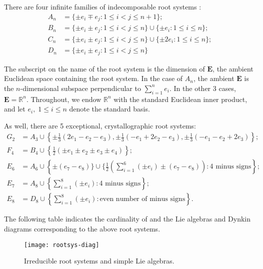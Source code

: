 \documentclass[12pt]{article}
\newcommand{\Eset}{\mathbf{E}}
\newcommand{\Rset}{\mathbb{R}}
\begin{document}
There are four infinite families of indecomposable root systems :
\begin{align*}
A_n &=\{ \pm e_i\mp e_j \colon 1\leq i<j\leq n+1\};\\
B_n &=\{\pm e_i\pm e_j \colon 1\leq i<j\leq n\}\cup \{ \pm e_i \colon
1\leq i\leq n\};\\
C_n &=\{\pm e_i\pm e_j \colon 1\leq i<j\leq n\}\cup\{\pm 2e_i \colon
1\leq i\leq n\};\\
D_n &=\{\pm e_i\pm e_j \colon 1\leq i<j\leq n\}
\end{align*}

The subscript on the name of the root system is the dimension of $\Eset$,
the ambient Euclidean space containing the root system. In the case of
$A_n$, the ambient $\Eset$ is the $n$-dimensional subspace perpendicular
to $\sum_{i=1}^n e_i$.  In the other 3 cases, $\Eset=\Rset^n$.
Throughout, we endow $\Rset^n$ with the standard Euclidean inner
product, and let $e_i,\; 1\leq i\leq n$ denote the standard basis.

As well, there are 5 exceptional, crystallographic root systems:
\begin{align*}
G_2 &=A_3 \cup \left\{ \pm\frac{1}{3}( 2 e_1 -e_2-e_3),
\pm\frac{1}{3}( - e_1 +2e_2-e_3),\pm\frac{1}{3}( - e_1 -e_2+2e_3)\right\};\\
F_4&=B_4 \cup \left\{ \frac{1}{2}(\pm e_1\pm e_2\pm e_3 \pm e_4)\right\};\\
E_6&= A_6 \cup \left\{ \pm(e_7-e_8) \} \cup \{ \frac{1}{2}(
\sum_{i=1}^6 (\pm e_i) \pm (e_7 - e_8)) \colon
\text{4 minus signs}\right\};\\
E_7&=A_8\cup \left\{\sum_{i=1}^8 (\pm e_i) \colon
\text{4 minus signs}\right\};\\
E_8&=D_8\cup \left\{\sum_{i=1}^8 (\pm e_i) \colon
\text{even number of minus signs}\right\}.
\end{align*}

The following table indicates the cardinality of and the Lie algebras
and Dynkin diagrams corresponding to the above root systems.
  \begin{figure}[h]
    \centering
    \texttt{[image: rootsys-diag]}
    \caption{Irreducible root systems and simple Lie algebras.}
  \end{figure}
\end{document}
